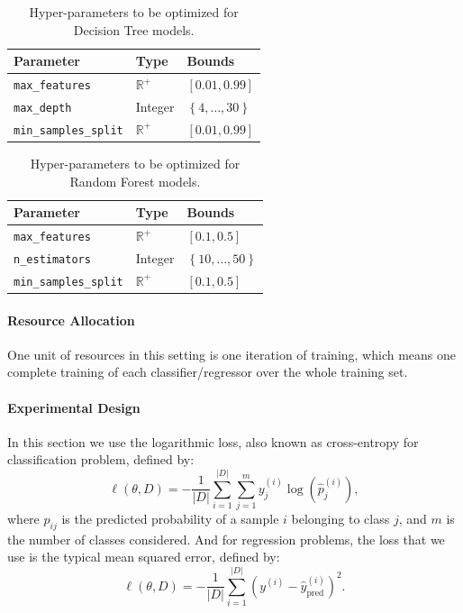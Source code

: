 \documentclass[twoside,11pt]{article}
\begin{document}
\begin{table}[ht]
\centering
\begin{tabular}{@{}lll@{}}
\toprule
\textbf{Parameter}             & \textbf{Type}  & \textbf{Bounds}                          \\ \midrule
\texttt{max\_features}      & $\mathbb{R}^+$ & $\left[0.01, 0.99\right]$   \\
\texttt{max\_depth}          & Integer        & $\left\lbrace 4, \dots, 30 \right\rbrace$ \\
\texttt{min\_samples\_split}  & $\mathbb{R}^+$  & $\left[0.01, 0.99\right]$
\end{tabular}
\caption{Hyper-parameters to be optimized for Decision Tree models.}
\label{treeparam}
\end{table}

\begin{table}[ht]
\centering
\begin{tabular}{@{}lll@{}}
\toprule
\textbf{Parameter}             & \textbf{Type}  & \textbf{Bounds}                          \\ \midrule
\texttt{max\_features}      & $\mathbb{R}^+$ & $\left[0.1, 0.5\right]$   \\
\texttt{n\_estimators}          & Integer        & $\left\lbrace 10, \dots, 50 \right\rbrace$ \\
\texttt{min\_samples\_split}  & $\mathbb{R}^+$  & $\left[0.1, 0.5\right]$
\end{tabular}
\caption{Hyper-parameters to be optimized for Random Forest models.}
\label{rfparam}
\end{table}

\paragraph{\textbf{Resource Allocation}} One unit of resources in this setting is one iteration of training, which means one complete training of each classifier/regressor over the whole training set.  

\paragraph{\textbf{Experimental Design}} In this section we use the logarithmic loss, also known as cross-entropy for classification problem, defined by:
\[
\ell(\theta, D) = - \frac{1}{|D|} \sum_{i=1}^{|D|} \sum_{j=1}^m y^{(i)}_{j}\log(\hat{p}^{(i)}_{j}),
\]
where $\hat{p}_{ij}$ is the predicted probability of a sample $i$ belonging to class $j$, and $m$ is the number of classes considered. And for regression problems, the loss that we use is the typical mean squared error, defined by:
\[
\ell(\theta, D) = - \frac{1}{|D|} \sum_{i=1}^{|D|} \left(y^{(i)} - \hat{y}^{(i)}_{\operatorname{pred}}\right)^2.
\]
\end{document}

